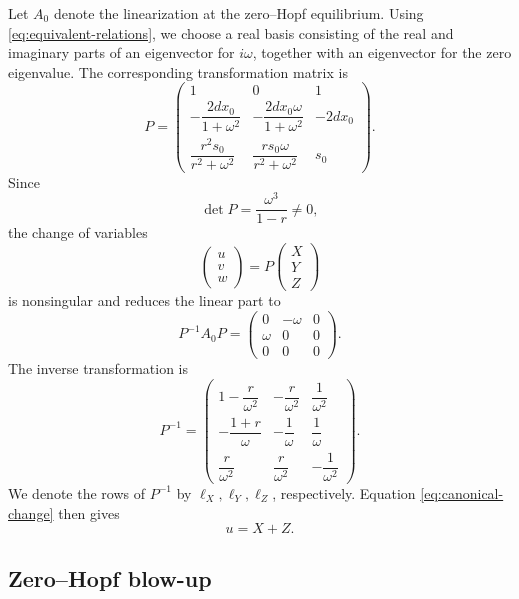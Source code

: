 \documentclass[11pt]{amsart}
\theoremstyle{remark}
\begin{document}
Let \(A_0\) denote the linearization at the zero--Hopf equilibrium.
Using \eqref{eq:equivalent-relations}, we choose a real basis consisting of
the real and imaginary parts of an eigenvector for \(i\omega\), together
with an eigenvector for the zero eigenvalue.  The corresponding
transformation matrix is
\begin{equation}\label{eq:P}
P=
\begin{pmatrix}
1&0&1\\[2mm]
-\dfrac{2dx_0}{1+\omega^2}
&-\dfrac{2dx_0\omega}{1+\omega^2}
&-2dx_0\\[3mm]
\dfrac{r^2s_0}{r^2+\omega^2}
&\dfrac{rs_0\omega}{r^2+\omega^2}
&s_0
\end{pmatrix}.
\end{equation}
Since
\[
 \det P=\frac{\omega^3}{1-r}\ne0,
\]
the change of variables
\begin{equation}\label{eq:canonical-change}
 \begin{pmatrix}u\\v\\w\end{pmatrix}
 =
 P\begin{pmatrix}X\\Y\\Z\end{pmatrix}
\end{equation}
is nonsingular and reduces the linear part to
\begin{equation}\label{eq:canonical-linear}
 P^{-1}A_0P=
 \begin{pmatrix}
 0&-\omega&0\\
 \omega&0&0\\
 0&0&0
 \end{pmatrix}.
\end{equation}
The inverse transformation is
\begin{equation}\label{eq:P-inverse}
P^{-1}=
\begin{pmatrix}
1-\dfrac{r}{\omega^2}&-\dfrac{r}{\omega^2}&\dfrac{1}{\omega^2}\\[3mm]
-\dfrac{1+r}{\omega}&-\dfrac{1}{\omega}&\dfrac{1}{\omega}\\[3mm]
\dfrac{r}{\omega^2}&\dfrac{r}{\omega^2}&-\dfrac{1}{\omega^2}
\end{pmatrix}.
\end{equation}
We denote the rows of \(P^{-1}\) by
\(\ell_X,\ell_Y,\ell_Z\), respectively.  Equation
\eqref{eq:canonical-change} then gives
\[
 u=X+Z.
\]

\subsection{Zero--Hopf blow-up}
\end{document}
